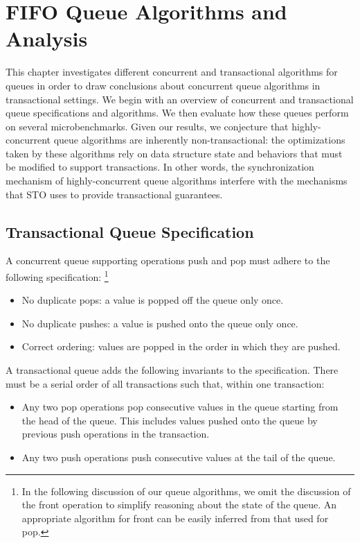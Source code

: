 \chapter{FIFO Queue Algorithms and Analysis}
\label{queue}

This chapter investigates different concurrent and transactional algorithms for queues in order to draw conclusions about concurrent queue algorithms in transactional settings. We begin with an overview of concurrent and transactional queue specifications and algorithms. We then evaluate how these queues perform on several microbenchmarks. Given our results, we conjecture that highly-concurrent queue algorithms are inherently non-transactional: the optimizations taken by these algorithms rely on data structure state and behaviors that must be modified to support transactions. In other words, the synchronization mechanism of highly-concurrent queue algorithms interfere with the mechanisms that STO uses to provide transactional guarantees.

\section{Transactional Queue Specification}

A concurrent queue supporting operations push and pop must adhere to the following specification:%
\footnote{In the following discussion of our queue algorithms, we omit the discussion of the front operation to simplify reasoning about the state of the queue. An appropriate algorithm for front can be easily inferred from that used for pop.}
\begin{itemize}
    \item No duplicate pops: a value is popped off the queue only once.
    \item No duplicate pushes: a value is pushed onto the queue only once.
    \item Correct ordering: values are popped in the order in which they are pushed.
\end{itemize}

\noindent
A transactional queue adds the following invariants to the specification. There must be a serial order of all transactions such that, within one transaction:
\begin{itemize}
    \item Any two pop operations pop consecutive values in the queue starting from the head of the queue. This includes values pushed onto the queue by previous push operations in the transaction.
    \item Any two push operations push consecutive values at the tail of the queue.
\end{itemize}

